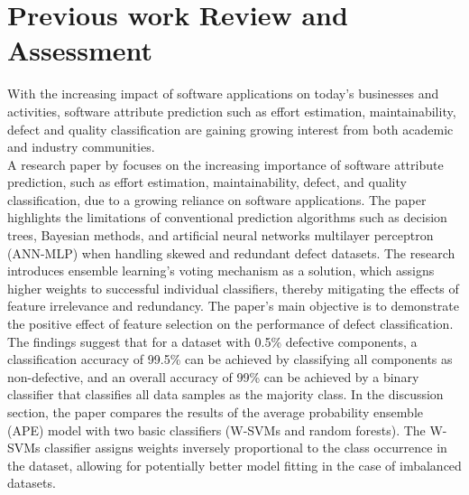 \documentclass[12pt]{report}
\begin{document}
\chapter*{Previous work Review and Assessment}
With the increasing impact of software applications on today's businesses and
activities, software attribute prediction such as effort estimation,
maintainability, defect and quality classification are gaining growing
interest from both academic and industry communities.\\

A research paper by\cite{LARADJI2015388} focuses on the increasing importance
of software attribute prediction, such as effort estimation, maintainability,
defect, and quality classification, due to a growing reliance on software
applications. The paper highlights the limitations of conventional prediction
algorithms such as decision trees, Bayesian methods, and artificial neural
networks multilayer perceptron (ANN-MLP) when handling skewed and redundant
defect datasets. The research introduces ensemble learning's voting mechanism
as a solution, which assigns higher weights to successful individual
classifiers, thereby mitigating the effects of feature irrelevance and
redundancy. The paper's main objective is to demonstrate the positive effect of
feature selection on the performance of defect classification. The findings
suggest that for a dataset with 0.5\% defective components, a classification
accuracy of 99.5\% can be achieved by classifying all components as
non-defective, and an overall accuracy of 99\% can be achieved by a binary
classifier that classifies all data samples as the majority class. In the
discussion section, the paper compares the results of the average probability
ensemble (APE) model with two basic classifiers (W-SVMs and random forests).
The W-SVMs classifier assigns weights inversely proportional to the class
occurrence in the dataset, allowing for potentially better model fitting in the
case of imbalanced datasets. \\
\end{document}
